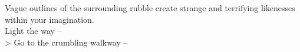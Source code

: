Vague outlines of the surrounding rubble create strange and terrifying likenesses within your imagination.\\

 Light the way -- \\
> Go to the crumbling walkway -- 